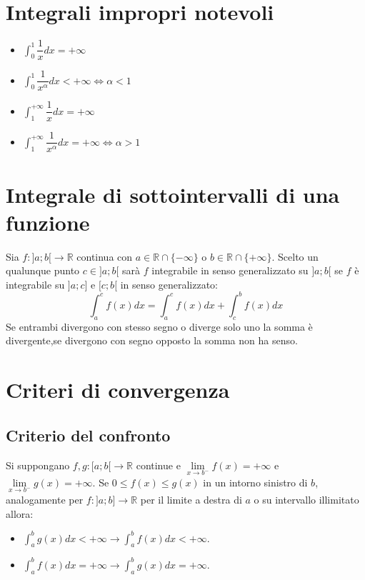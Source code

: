 \section{Integrali impropri notevoli}
\begin{multicols}{2}
\begin{itemize}
\item $\int_0^1\dfrac{1}{x}dx=+\infty$
\item $\int_0^1\dfrac{1}{x^\alpha}dx<+\infty\Leftrightarrow\alpha<1$
\item $\int_1^{+\infty}\dfrac{1}{x}dx=+\infty$
\item $\int_1^{+\infty}\dfrac{1}{x^\alpha}dx=+\infty\Leftrightarrow\alpha>1$
\end{itemize}
\end{multicols}
\section{Integrale di sottointervalli di una funzione}
Sia $f:]a;b[\rightarrow\mathbb{R}$ continua con $a\in\mathbb{R}\cap\{-\infty\}$ o $b\in\mathbb{R}\cap\{+\infty\}$. Scelto un qualunque punto $c\in]a;b[$ sar\`a $f$ integrabile in 
senso generalizzato su $]a;b[$ se $f$ \`e integrabile su $]a;c]$ e $[c;b[$ in senso generalizzato:
\begin{equation}
\int_a^cf(x)dx=\int_a^cf(x)dx+\int_c^bf(x)dx
\end{equation}
Se entrambi divergono con stesso segno o diverge solo uno la somma \`e divergente,se divergono con segno opposto la somma non ha senso.
\section{Criteri di convergenza}
\subsection{Criterio del confronto}
Si suppongano $f,g:[a;b[\rightarrow\mathbb{R}$ continue e $\lim\limits_{x\rightarrow b^-}f(x)=+\infty$ e $\lim\limits_{x\rightarrow b^-}g(x)=+\infty$. Se $0\le f(x)\le g(x)$ in 
un intorno sinistro di $b$, analogamente per $f:]a;b]\rightarrow\mathbb{R}$ per il limite a destra di $a$ o su intervallo illimitato allora:
\begin{itemize}
\item $\int_a^bg(x)dx<+\infty\rightarrow\int_a^bf(x)dx<+\infty$.
\item $\int_a^bf(x)dx=+\infty\rightarrow\int_a^bg(x)dx=+\infty$.
\end{itemize}
